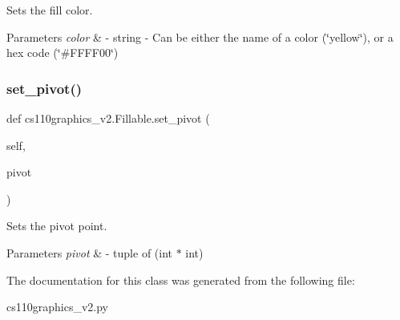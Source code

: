 Sets the fill color. 


\begin{DoxyParams}{Parameters}
{\em color} & -\/ string -\/ Can be either the name of a color (\char`\"{}yellow\char`\"{}), or a hex code (\char`\"{}\#\+F\+F\+F\+F00\char`\"{}) \\
\hline
\end{DoxyParams}
\mbox{\label{classcs110graphics__v2_1_1Fillable_a1be2f575dbf8963ecba1e9e9adec1206}} 
\subsubsection{\texorpdfstring{set\_pivot()}{set\_pivot()}}
{\footnotesize\ttfamily def cs110graphics\+\_\+v2.\+Fillable.\+set\+\_\+pivot (\begin{DoxyParamCaption}\item[{}]{self,  }\item[{}]{pivot }\end{DoxyParamCaption})}



Sets the pivot point. 


\begin{DoxyParams}{Parameters}
{\em pivot} & -\/ tuple of (int $\ast$ int) \\
\hline
\end{DoxyParams}


The documentation for this class was generated from the following file\+:\begin{DoxyCompactItemize}
\item 
cs110graphics\+\_\+v2.\+py\end{DoxyCompactItemize}
